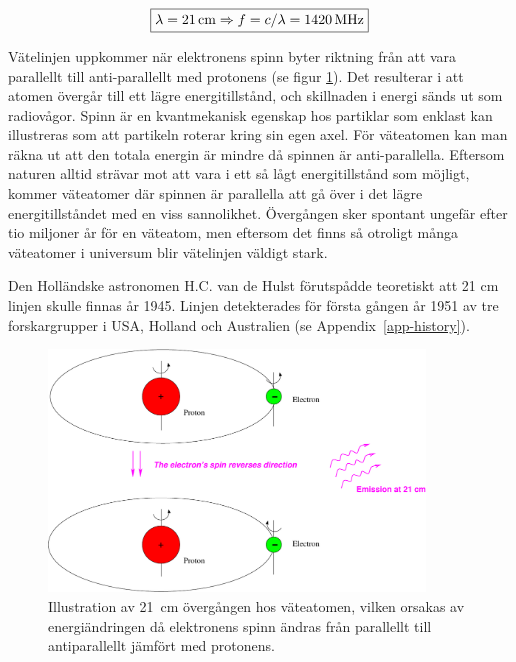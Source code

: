 \begin{equation}
\boxed{
\lambda = 21 \, {\rm cm}
\Rightarrow f=c/\lambda = 1420 \, {\rm MHz}}
\end{equation}

Vätelinjen uppkommer när elektronens spinn byter riktning från att vara
parallellt till anti-parallellt med protonens (se figur \ref{fighyperfin}).
Det resulterar i att atomen övergår till ett lägre energitillstånd, och
skillnaden i energi sänds ut som radiovågor. Spinn är en kvantmekanisk egenskap
hos partiklar som enklast kan illustreras som att partikeln roterar kring sin
egen axel. För väteatomen kan man räkna ut att den totala energin är mindre då
spinnen är anti-parallella. Eftersom naturen alltid strävar mot att vara i ett
så lågt energitillstånd som möjligt, kommer väteatomer där spinnen är
parallella att gå över i det lägre energitillståndet med en viss sannolikhet.
Övergången sker spontant ungefär efter tio miljoner år för en väteatom, men
eftersom det finns så otroligt många väteatomer i universum blir vätelinjen
väldigt stark. 

Den Holländske astronomen H.C. van de Hulst förutspådde teoretiskt att
21 cm linjen skulle finnas år 1945. Linjen detekterades för första
gången år 1951 av tre forskargrupper i USA, Holland och Australien (se
Appendix~\ref{app-history}).

\begin{figure}[ht]
\begin{center}
	\vspace{-1cm}
\includegraphics[width=10cm]{../figures/hyperfine.pdf}
\end{center}
\caption{Illustration av 21~cm övergången hos väteatomen, vilken orsakas
  av energiändringen då elektronens spinn ändras från parallellt till
  antiparallellt jämfört med protonens.}
\label{fighyperfin}
\end{figure}  


